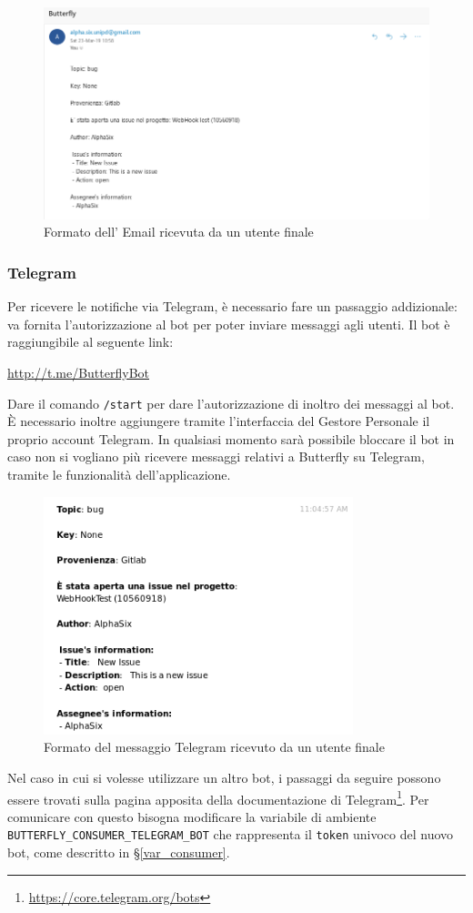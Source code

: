 \begin{figure}[H]
	\centering
	\includegraphics[width=\textwidth]{img/notifica_email_1.png}
	\caption{Formato dell' Email ricevuta da un utente finale}
\end{figure}

\subsubsection{Telegram}

Per ricevere le notifiche via Telegram, è necessario fare un passaggio addizionale: va fornita l'autorizzazione al bot per poter inviare messaggi agli utenti.
Il bot è raggiungibile al seguente link:
\begin{center}
    \url{http://t.me/ButterflyBot}
\end{center}

Dare il comando \texttt{/start} per dare l'autorizzazione di inoltro dei messaggi al bot.
È necessario inoltre aggiungere tramite l'interfaccia del Gestore Personale il proprio account Telegram.
In qualsiasi momento sarà possibile bloccare il bot in caso non si vogliano più ricevere messaggi relativi a Butterfly su Telegram, tramite le funzionalità dell'applicazione.
\begin{figure}[H]
	\centering
	\includegraphics[width=9cm]{img/notifica_telegram_1.png}
	\caption{Formato del messaggio Telegram ricevuto da un utente finale}
\end{figure}
Nel caso in cui si volesse utilizzare un altro bot, i passaggi da seguire possono essere trovati sulla pagina apposita della documentazione di Telegram\footnote{\url{https://core.telegram.org/bots}}.
Per comunicare con questo bisogna modificare la variabile di ambiente \texttt{BUTTERFLY\_CONSUMER\_TELEGRAM\_BOT} che rappresenta il \texttt{token} univoco del nuovo bot, come descritto in \S\ref{var_consumer}.

